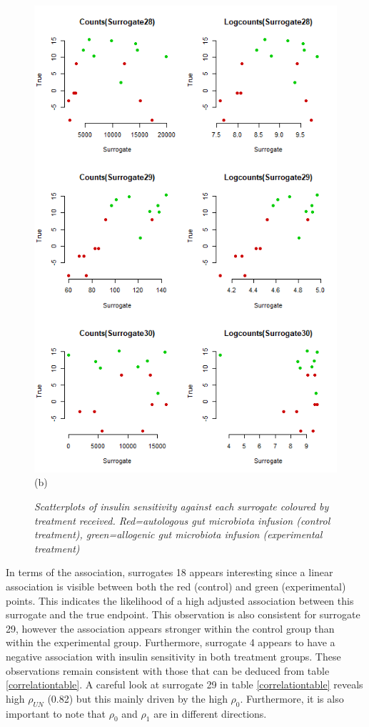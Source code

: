 \documentclass[a4paper,12pt]{article}
\begin{document}
\begin{figure}[H]
\begin{minipage}{0.5\textwidth}
			\includegraphics[scale=0.5]{exploration-10.png}\\(b)
		\end{minipage}
		\caption{\small \textit{Scatterplots of insulin sensitivity against each surrogate coloured by treatment received. Red=autologous gut microbiota infusion (control treatment), green=allogenic gut microbiota infusion (experimental treatment)}}
	\end{figure}
	In terms of the association, surrogates 18 appears interesting since a linear association is visible between both the red (control) and green (experimental) points. This indicates the likelihood of a high adjusted association between this surrogate and the true endpoint. This observation is also consistent for surrogate 29, however the association appears stronger within the control group than within the experimental group. Furthermore, surrogate 4 appears to have a negative association with insulin sensitivity in both treatment groups. These observations remain consistent with those that can be deduced from table \ref{correlationtable}. A careful look at surrogate 29 in table \ref{correlationtable} reveals high $\rho_{UN}$ (0.82) but this mainly driven by the high $\rho_0$. Furthermore, it is also important to note that $\rho_0$ and $\rho_1$ are in different directions.
	
\end{document}
